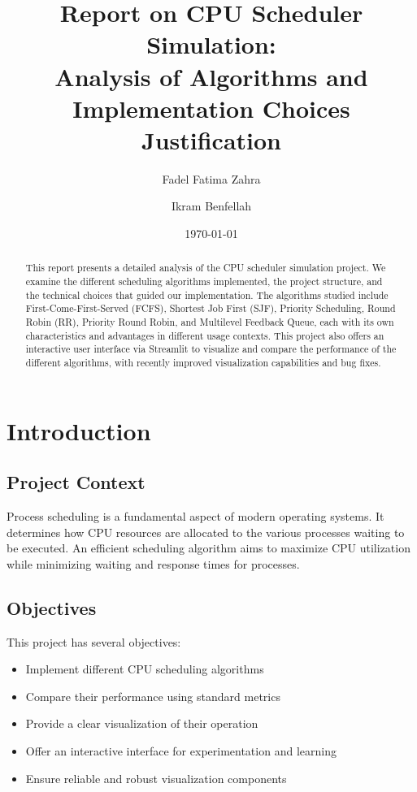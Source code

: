 \documentclass[12pt,a4paper]{article}
\title{Report on CPU Scheduler Simulation: \\
Analysis of Algorithms and Implementation Choices Justification}
\author{Fadel Fatima Zahra \and Ikram Benfellah}
\date{\today}
\begin{document}
\maketitle

\begin{abstract}
This report presents a detailed analysis of the CPU scheduler simulation project. We examine the different scheduling algorithms implemented, the project structure, and the technical choices that guided our implementation. The algorithms studied include First-Come-First-Served (FCFS), Shortest Job First (SJF), Priority Scheduling, Round Robin (RR), Priority Round Robin, and Multilevel Feedback Queue, each with its own characteristics and advantages in different usage contexts. This project also offers an interactive user interface via Streamlit to visualize and compare the performance of the different algorithms, with recently improved visualization capabilities and bug fixes.
\end{abstract}

\tableofcontents

\newpage

\section{Introduction}
\subsection{Project Context}
Process scheduling is a fundamental aspect of modern operating systems. It determines how CPU resources are allocated to the various processes waiting to be executed. An efficient scheduling algorithm aims to maximize CPU utilization while minimizing waiting and response times for processes.

\subsection{Objectives}
This project has several objectives:
\begin{itemize}
    \item Implement different CPU scheduling algorithms
    \item Compare their performance using standard metrics
    \item Provide a clear visualization of their operation
    \item Offer an interactive interface for experimentation and learning
    \item Ensure reliable and robust visualization components
\end{itemize}
\end{document}
